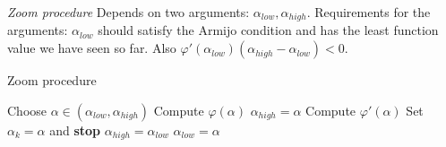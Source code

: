 \begin{definition} \textit{Zoom procedure}
Depends on two arguments: $\alpha_{low}, \alpha_{high}$. Requirements for the arguments: $\alpha_{low}$ should satisfy the Armijo condition and has the least function value we have seen so far. Also $\varphi'(\alpha_{low})(\alpha_{high} - \alpha_{low}) < 0$.
\begin{algorithm}[H]
  \caption{Zoom procedure}
  \begin{algorithmic}[1]
      \State Choose $\alpha \in (\alpha_{low}, \alpha_{high})$
      \State Compute $\varphi(\alpha)$
          \State $\alpha_{high} = \alpha$
      \EndIf
      \State Compute $\varphi'(\alpha)$
          \State Set $\alpha_k = \alpha$ and \textbf{stop}
      \EndIf
          \State $\alpha_{high} = \alpha_{low}$
      \EndIf
      \State $\alpha_{low} = \alpha$
  \EndWhile
\end{algorithmic}
\end{algorithm}
\end{definition}

\newpage
